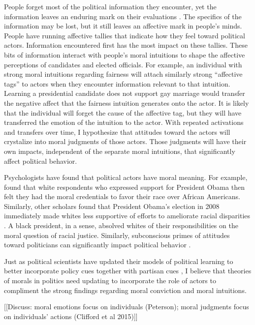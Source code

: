 People forget most of the political information they encounter, yet the information leaves an enduring mark on their evaluations \cite{LodgeMcGrawStroh1989,LodgeSteenbergenBrau1995}. The specifics of the information may be lost, but it still leaves an affective mark in people's minds. People have running affective tallies that indicate how they feel toward political actors. Information encountered first has the most impact on these tallies. These bits of information interact with people's moral intuitions to shape the affective perceptions of candidates and elected officials. For example, an individual with strong moral intuitions regarding fairness will attach similarly strong ``affective tags'' to actors when they encounter information relevant to that intuition. Learning a presidential candidate does not support gay marriage would transfer the negative affect that the fairness intuition generates onto the actor. It is likely that the individual will forget the cause of the affective tag, but they will have transferred the emotion of the intuition to the actor. With repeated activations and transfers over time, I hypothesize that attitudes toward the actors will crystalize into moral judgments of those actors. Those judgments will have their own impacts, independent of the separate moral intuitions, that significantly affect political behavior.

Psychologists have found that political actors have moral meaning. For example,  found that white respondents who expressed support for President Obama then felt they had the moral credentials to favor their race over African Americans. Similarly, other scholars found that President Obama's election in 2008 immediately made whites less supportive of efforts to ameliorate racial disparities \cite{Kaiseretal2009}. A black president, in a sense, absolved whites of their responsibilities on the moral question of racial justice. Similarly, subconscious primes of attitudes toward politicians can significantly impact political behavior \cite{WeinbergerWesten2008}.

Just as political scientists have updated their models of political learning to better incorporate policy cues together with partisan cues \cite{Bullock2011,Highton2012}, I believe that theories of morals in politics need updating to incorporate the role of actors to compliment the strong findings regarding moral conviction and moral intuitions.

[[Discuss: moral emotions focus on individuals (Peterson); moral judgments focus on individuals' actions (Clifford et al 2015)]]


